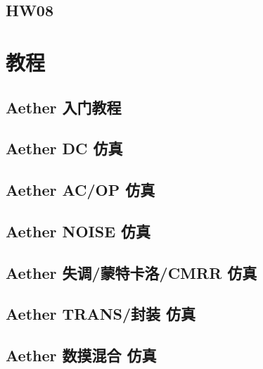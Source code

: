 \documentclass[cn,11pt,english,black,simple,device=ppt]{elegantbook}
\begin{document}
\chapter{HW08}

 

\part{教程}

\chapter{Aether 入门教程}

 


\chapter{Aether DC 仿真}

 

\chapter{Aether AC/OP 仿真}

 

\chapter{Aether NOISE 仿真}

 


\chapter{Aether 失调/蒙特卡洛/CMRR 仿真}

 



\chapter{Aether TRANS/封装 仿真}

 



\chapter{Aether 数摸混合 仿真}

 
\end{document}
